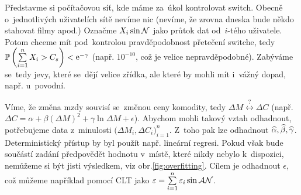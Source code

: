 \begin{example}[MEX] Představme si počítačovou síť, kde máme za~úkol kontrolovat switch. Obecně o~jednotlivých uživatelích sítě nevíme nic (nevíme, že zrovna dneska bude někdo stahovat filmy apod.) Označme $X_i\sin\mathcal{N}$ jako průtok dat od~$i$-tého uživatele. Potom chceme mít pod~kontrolou pravděpodobnost přetečení switche, tedy $\mathbb{P}\left( \sum\limits_{i=1}^{n} X_i>C_s \right)<\mathrm{e}^{-\gamma}$ (např. $10^{-10}$, což je velice nepravděpodobné). Zabýváme se~tedy jevy, které se~dějí velice zřídka, ale které by mohli mít i~vážný dopad, např. u~povodní. 
\end{example}
\begin{example}[Ekonometrie]
	Víme, že změna mzdy souvisí se~změnou ceny komodity, tedy $\Delta M \stackrel{?}{\leftrightarrow}\Delta C$ (např. $\Delta C=\alpha+\beta(\Delta M)^2+\gamma\ln\Delta M+\epsilon$). Abychom mohli takový vztah odhadnout, potřebujeme data z~minulosti $\big(\Delta M_i,\Delta C_i\big)_{i=1}^n$. Z~toho pak lze odhadnout $\widehat{\alpha},\widehat{\beta},\widehat{\gamma}$. Deterministický přístup by byl použít např. lineární regresi. Pokud však bude součástí zadání předpovědět hodnotu v~místě, které nikdy nebylo k~dispozici, nemůžeme si být jisti výsledkem, viz obr.\ref{fig:overfitting}. Cílem je odhadnout $\epsilon$, což můžeme například pomocí CLT jako $\varepsilon=\sum\limits_{i=1}^{n} \varepsilon_i\sin\mathcal{AN}$.
\end{example}

